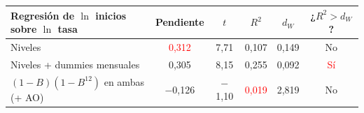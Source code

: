 \begin{tabular}{lccccc}
\toprule
Regresi\'on de $\ln$ inicios sobre $\ln$ tasa & Pendiente & $t$ & $R^2$ & $d_W$ & ¿$R^2>d_W$?
\\ \midrule
Niveles & \textcolor{red}{0{,}312} & 7{,}71 & 0{,}107 & 0{,}149 & No \\
Niveles + dummies mensuales & 0{,}305 & 8{,}15 & 0{,}255 & 0{,}092 & \textcolor{red}{S\'i} \\
$(1-B)(1-B^{12})$ en ambas (+ AO) & \ensuremath{-}0{,}126 & \ensuremath{-}1{,}10 & \textcolor{red}{0{,}019} & 2{,}819 & No \\
\bottomrule
\end{tabular}
